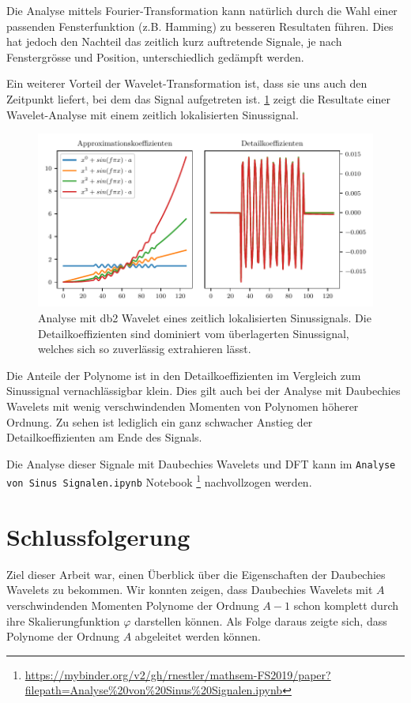 \begin{refsection}
Die Analyse mittels Fourier-Transformation kann natürlich durch die Wahl einer
passenden Fensterfunktion (z.B. Hamming) zu besseren Resultaten führen. Dies
hat jedoch den Nachteil das zeitlich kurz auftretende Signale, je nach
Fenstergrösse und Position, unterschiedlich gedämpft werden.

Ein weiterer Vorteil der Wavelet-Transformation ist, dass sie uns auch den
Zeitpunkt liefert, bei dem das Signal aufgetreten ist.
\cref{polynomials:sin:padded} zeigt die Resultate einer Wavelet-Analyse mit
einem zeitlich lokalisierten Sinussignal.
\begin{figure}
    \centering
    \includegraphics{papers/polynomials/images/polynomials_sin_padded_db2.pdf}
    \caption{Analyse mit db2 Wavelet eines zeitlich lokalisierten
             Sinussignals. Die Detailkoeffizienten sind dominiert vom
             überlagerten Sinussignal, welches sich so zuverlässig extrahieren
             lässt.\label{polynomials:sin:padded}}
\end{figure}
Die Anteile der Polynome ist in den Detailkoeffizienten im Vergleich zum
Sinussignal vernachlässigbar klein. Dies gilt auch bei der Analyse mit
Daubechies Wavelets mit wenig verschwindenden Momenten von Polynomen höherer
Ordnung. Zu sehen ist lediglich ein ganz schwacher Anstieg der
Detailkoeffizienten am Ende des Signals.

Die Analyse dieser Signale mit Daubechies Wavelets und DFT kann im
\texttt{Analyse von Sinus Signalen.ipynb} Notebook%
\footnote{\url{https://mybinder.org/v2/gh/rnestler/mathsem-FS2019/paper?filepath=Analyse\%20von\%20Sinus\%20Signalen.ipynb}}
nachvollzogen werden.

\section{Schlussfolgerung}
Ziel dieser Arbeit war, einen Überblick über die Eigenschaften der Daubechies
Wavelets zu bekommen. Wir konnten zeigen, dass Daubechies Wavelets mit $A$
verschwindenden Momenten Polynome der Ordnung $A-1$ schon komplett durch ihre
Skalierungfunktion $\varphi$ darstellen können. Als Folge daraus zeigte sich,
dass Polynome der Ordnung $A$ abgeleitet werden können.


\end{refsection}

